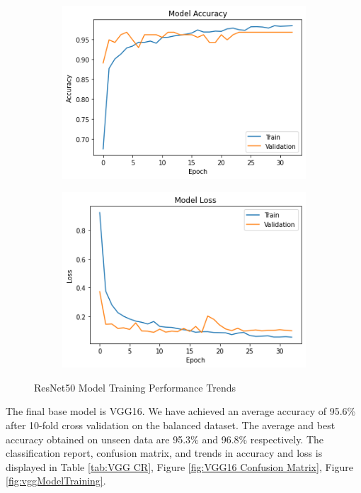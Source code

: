 \vspace{-\parskip}
\begin{figure}[H]
        \begin{subfigure}[b]{0.5\textwidth}
                \includegraphics[width=\linewidth]{Images/ResNetAcc.png}
        \end{subfigure}%
        \begin{subfigure}[b]{0.5\textwidth}
                \includegraphics[width=\linewidth]{Images/ResNetLoss.png}
        \end{subfigure}%
        \caption{ResNet50 Model Training Performance Trends}\label{fig:resnetModelTraining}
\end{figure}
\vspace{-1em}
The final base model is VGG16. We have achieved an average accuracy of 95.6\% after 10-fold cross validation on the balanced dataset. The average and best accuracy obtained on unseen data are 95.3\% and 96.8\% respectively. The classification report, confusion matrix, and trends in accuracy and loss is displayed in Table \ref{tab:VGG CR}, Figure \ref{fig:VGG16 Confusion Matrix}, Figure \ref{fig:vggModelTraining}.

